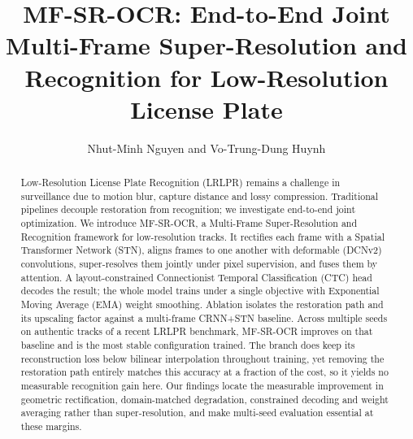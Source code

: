 \documentclass[runningheads]{llncs}
\begin{document}
%
\title{MF-SR-OCR: End-to-End Joint Multi-Frame Super-Resolution and Recognition for Low-Resolution License Plate}
%
%
\author{Nhut-Minh Nguyen and
Vo-Trung-Dung Huynh
}
%
%
%
\maketitle              %
%
\begin{abstract}
Low-Resolution License Plate Recognition (LRLPR) remains a challenge in surveillance due to motion blur, capture distance and lossy compression. Traditional pipelines decouple restoration from recognition; we investigate end-to-end joint optimization. We introduce MF-SR-OCR, a Multi-Frame Super-Resolution and Recognition framework for low-resolution tracks. It rectifies each frame with a Spatial Transformer Network (STN), aligns frames to one another with deformable (DCNv2) convolutions, super-resolves them jointly under pixel supervision, and fuses them by attention. A layout-constrained Connectionist Temporal Classification (CTC) head decodes the result; the whole model trains under a single objective with Exponential Moving Average (EMA) weight smoothing. Ablation isolates the restoration path and its upscaling factor against a multi-frame CRNN+STN baseline. Across multiple seeds on authentic tracks of a recent LRLPR benchmark, MF-SR-OCR improves on that baseline and is the most stable configuration trained. The branch does keep its reconstruction loss below bilinear interpolation throughout training, yet removing the restoration path entirely matches this accuracy at a fraction of the cost, so it yields no measurable recognition gain here. Our findings locate the measurable improvement in geometric rectification, domain-matched degradation, constrained decoding and weight averaging rather than super-resolution, and make multi-seed evaluation essential at these margins.
\end{abstract}
%
%
%
\end{document}
